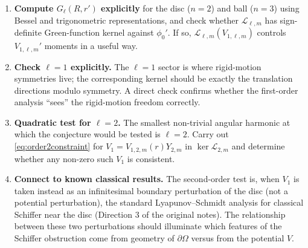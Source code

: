 \documentclass[11pt]{article}
\newcommand{\Om}{\Omega}
\newcommand{\1}{\mathbf 1}
\begin{document}
\begin{enumerate}[leftmargin=*]
    \item \textbf{Compute $G_\ell(R,r')$ explicitly} for the disc
    ($n=2$) and ball ($n=3$) using Bessel and trigonometric
    representations, and check whether $\mathcal{L}_{\ell,m}$ has
    sign-definite Green-function kernel against $\phi_0'$. If
    so, $\mathcal{L}_{\ell,m}(V_{1,\ell,m})$ controls
    $V_{1,\ell,m}'$ moments in a useful way.
    \item \textbf{Check $\ell=1$ explicitly.} The $\ell=1$ sector is
    where rigid-motion symmetries live; the corresponding kernel
    should be exactly the translation directions modulo symmetry. A
    direct check confirms whether the first-order analysis ``sees''
    the rigid-motion freedom correctly.
    \item \textbf{Quadratic test for $\ell=2$.} The smallest
    non-trivial angular harmonic at which the conjecture would be
    tested is $\ell=2$. Carry out
    \eqref{eq:order2constraint} for $V_1=V_{1,2,m}(r)Y_{2,m}$ in
    $\ker\mathcal{L}_{2,m}$ and determine whether any non-zero such
    $V_1$ is consistent.
    \item \textbf{Connect to known classical results.} The
    second-order test is, when $V_1$ is taken instead as an
    infinitesimal boundary perturbation of the disc (not a potential
    perturbation), the standard Lyapunov--Schmidt analysis for
    classical Schiffer near the disc (Direction 3 of the original
    notes). The relationship between these two perturbations should
    illuminate which features of the Schiffer obstruction come from
    geometry of $\partial\Om$ versus from the potential $V$.
\end{enumerate}
\end{document}
